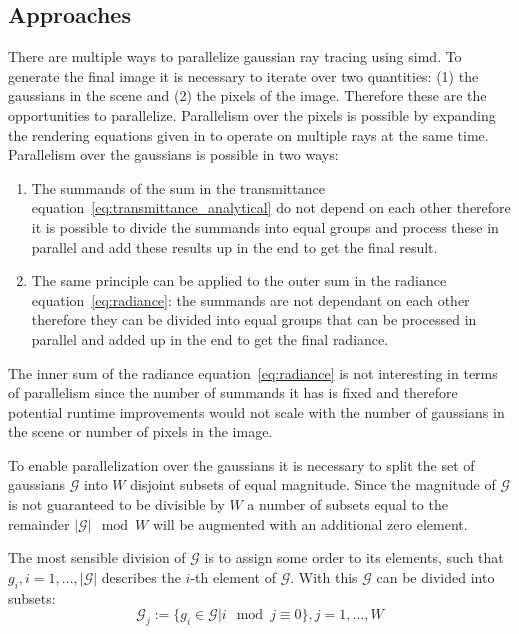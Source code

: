 \documentclass[a4paper, 11pt]{memoir}
\begin{document}
    \subsection{Approaches}
    There are multiple ways to parallelize gaussian ray tracing using \gls{simd}. To generate the final image it is necessary to iterate
    over two quantities: (1) the gaussians in the scene and (2) the pixels of the image. Therefore these are the opportunities to parallelize.
    Parallelism over the pixels is possible by expanding the rendering equations given in \cite{Rhodin:2015} to operate on multiple rays at the
    same time. Parallelism over the gaussians is possible in two ways:
    \begin{enumerate}
        \item The summands of the sum in the \gls{transmittance} equation~\eqref{eq:transmittance_analytical} do not depend on each
            other therefore it is possible to divide the summands into equal groups and process these in parallel
            and add these results up in the end to get the final result.
        \item The same principle can be applied to the outer sum in the \gls{radiance} equation~\eqref{eq:radiance}: the summands are
            not dependant on each other therefore they can be divided into equal groups that can
            be processed in parallel and added up in the end to get the final \gls{radiance}.
    \end{enumerate}
    The inner sum of the \gls{radiance} equation~\eqref{eq:radiance} is not interesting in terms of parallelism since the number
    of summands it has is fixed and therefore potential runtime improvements would not scale with the number of gaussians in the scene or number
    of pixels in the image.

    To enable parallelization over the gaussians it is necessary to split the set of
    gaussians $\mathcal{G}$ into $W$ disjoint subsets of equal magnitude. Since the magnitude of $\mathcal{G}$ is not guaranteed to be divisible by $W$
    a number of subsets equal to the remainder $|\mathcal{G}| \mod W$ will be augmented with an additional zero element.

    The most sensible division of $\mathcal{G}$ is to assign some order to its elements, such that $g_i, i=1,\dots,|\mathcal{G}|$ describes the $i$-th element of
    $\mathcal{G}$. With this $\mathcal{G}$ can be divided into subsets:
    \[\mathcal{G}_j := \{ g_i \in \mathcal{G} | i \mod j \equiv 0 \}, j=1,\dots,W\]
\end{document}
